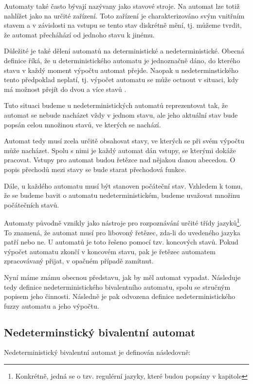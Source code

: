 \documentclass[a4paper,10pt]{article}
\begin{document}
Automaty také často bývají nazývany jako stavové stroje. Na automat lze totiž nahlížet jako na určité zařízení. Toto zařízení je charakterizováno svým vnitřním stavem a v závislosti na vstupu se tento stav diskrétně mění, tj. můžeme tvrdit, že automat přecháhází od jednoho stavu k jinému.

Důležité je také dělení automatů na deterministické a nedeterministické. Obecná definice říká, že u deterministického automatu je jednoznačně dáno, do kterého stavu v každý moment výpočtu automat přejde. Naopak u nedeterminstického tento předpoklad neplatí, tj. výpočet automatu se může octnout v situaci, kdy má možnost přejít do dvou a více stavů .

Tuto situaci budeme u nedeterministických automatů reprezentovat tak, že automat se nebude nacházet vždy v jednom stavu, ale jeho aktuální stav bude popsán celou množinou stavů, ve kterých se nachází.

Automat tedy musí zcela určitě obsahovat stavy, ve kterých se při svém výpočtu může nacházet. Spolu s nimi je každý automat dán vstupy, se kterými dokáže pracovat. Vstupy pro automat budou řetězce nad nějakou danou abecedou. O popis přechodů mezi stavy se bude starat přechodová funkce.

Dále, u každého automatu musí být stanoven počáteční stav. Vzhledem k tomu, že se budeme bavit o automatu nedeterministickém, budeme uvažovat množinu počátečních stavů.

Automaty původně vznikly jako nástroje pro rozpoznávání určité třídy jazyků\footnote{Konkrétně, jedná se o tzv. regulérní jazyky, které budou popsány v kapitole }. To znamená, že automat musí pro libovoný řetězec, zda-li do uvedeného jazyka patří nebo ne. U automatů je toto řešeno pomocí tzv. koncových stavů. Pokud výpočet automatu zkončí v koncovém stavu, pak je řetězec automatem zpracovávaný přijat, v opačném případě zamítnut.

Nyní máme známu obecnou představu, jak by měl automat vypadat. Následuje tedy definice nedeterministického bivalentního automatu, spolu se stručným popisem jeho činnosti. Následně je pak odvozena definice nedeterministického fuzzy automatu a jeho výpočtu.


\subsection{Nedeterminstický bivalentní automat}
Nedeterministický bivalentní automat je definován následovně:
\end{document}
